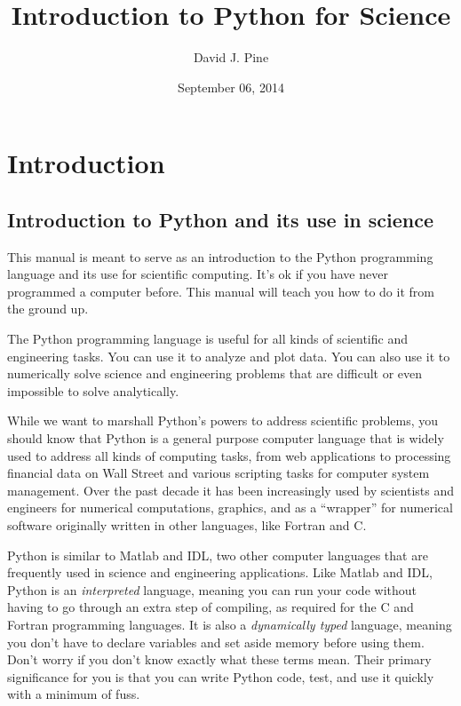 \documentclass[letterpaper,10pt,english]{sphinxmanual}
\title{Introduction to Python for Science}
\date{September 06, 2014}
\author{David J. Pine}
\begin{document}
\maketitle
\tableofcontents
{}\label{latex-contents::doc}



\chapter{Introduction}
\label{chap1/chap1_intro:introduction}\label{chap1/chap1_intro:welcome-to-pyman-s-documentation}\label{chap1/chap1_intro::doc}

\section{Introduction to Python and its use in science}
\label{chap1/chap1_intro:introduction-to-python-and-its-use-in-science}
This manual is meant to serve as an introduction to the Python programming language and its use for scientific computing.  It's ok if you have never programmed a computer before.  This manual will teach you how to do it from the ground up.

The Python programming language is useful for all kinds of scientific and engineering tasks.  You can use it to analyze and plot data.  You can also use it to numerically solve science and engineering problems that are difficult or even impossible to solve analytically.

While we want to marshall Python's powers to address scientific problems, you should know that Python is a general purpose computer language that is widely used to address all kinds of computing tasks, from web applications to processing financial data on Wall Street and various scripting tasks for computer system management.  Over the past decade it has been increasingly used by scientists and engineers for numerical computations, graphics, and as a ``wrapper'' for numerical software originally written in other languages, like Fortran and C.

Python is similar to Matlab and IDL, two other computer languages that are frequently used in science and engineering applications.  Like Matlab and IDL, Python is an \emph{interpreted} language, meaning you can run your code without having to go through an extra step of compiling, as required for the C and Fortran programming languages.  It is also a \emph{dynamically typed} language, meaning you don't have to declare variables and set aside memory before using them. Don't worry if you don't know exactly what these terms mean. Their primary significance for you is that you can write Python code, test, and use it quickly with a minimum of fuss.
\end{document}
